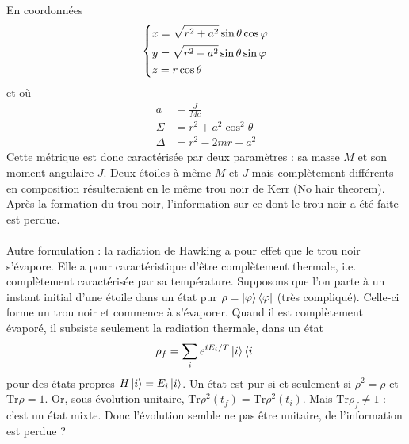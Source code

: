 \begin{enumerate}
    En coordonnées
    \begin{equation}
        \begin{dcases}
            x = \sqrt{r^2 + a^2} \sin \theta \cos\varphi\\
            y = \sqrt{r^2 +a^2} \sin \theta \sin \varphi \\
            z = r \cos\theta
        \end{dcases}
    \end{equation}
    et où
    \begin{align}
        a &= \frac{J}{Mc}\\
        \Sigma &= r^2 + a^2 \cos^2 \theta\\
        \Delta &= r^2 - 2m r + a^2
    \end{align}
    Cette métrique est donc caractérisée par deux paramètres : sa masse $M$ et son moment angulaire $J$. Deux étoiles à même $M$ et $J$ mais complètement différents en composition résulteraient en le même trou noir de Kerr (No hair theorem). \\
    Après la formation du trou noir, l'information sur ce dont le trou noir a été faite est perdue.\\
    \\
    Autre formulation : la radiation de Hawking a pour effet que le trou noir s'évapore. Elle a pour caractéristique d'être complètement thermale, i.e. complètement caractérisée par sa température. Supposons que l'on parte à un instant initial d'une étoile dans un état pur $\rho = \ket{\varphi} \bra{\varphi}$ (très compliqué). Celle-ci forme un trou noir et commence à s'évaporer. Quand il est complètement évaporé, il subsiste seulement la radiation thermale, dans un état
    \begin{equation}
        \rho_f = \sum_i e^{iE_i/T} \ket{i}\bra{i} 
    \end{equation}
    pour des états propres  $H \ket{i} = E_i \ket{i}$. Un état est pur si et seulement si $\rho^2 = \rho$ et $\mathrm{Tr} \rho = 1$. Or, sous évolution unitaire, $\mathrm{Tr} \rho^2 (t_f) = \mathrm{Tr} \rho^2(t_i)$. Mais $\mathrm{Tr} \rho_f \neq 1$ : c'est un état mixte. Donc l'évolution semble ne pas être unitaire, de l'information est perdue ?
\end{enumerate}